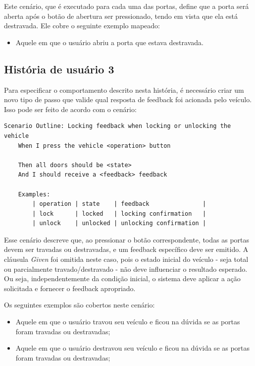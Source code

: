 Este cenário, que é executado para cada uma das portas, define que a porta será aberta após o botão de abertura ser pressionado, tendo em vista que ela 
está destravada. Ele cobre o seguinte exemplo mapeado:

\begin{itemize}
    \item Aquele em que o usuário abriu a porta que estava destravada.
\end{itemize}


\subsection{História de usuário 3}

Para especificar o comportamento descrito nesta história, é necessário criar um novo tipo de passo que valide qual resposta de feedback foi acionada pelo veículo. 
Isso pode ser feito de acordo com o cenário:

\begin{verbatim}
Scenario Outline: Locking feedback when locking or unlocking the vehicle
    When I press the vehicle <operation> button

    Then all doors should be <state>
    And I should receive a <feedback> feedback

    Examples:
        | operation | state    | feedback               |
        | lock      | locked   | locking confirmation   |
        | unlock    | unlocked | unlocking confirmation |
\end{verbatim}

Esse cenário descreve que, ao pressionar o botão correspondente, todas as portas devem ser travadas ou destravadas, e um feedback específico deve ser emitido. A cláusula \textit{Given} foi omitida neste caso, pois o estado inicial do veículo - seja total ou parcialmente travado/destravado - não deve influenciar 
o resultado esperado. Ou seja, independentemente da condição inicial, o sistema deve aplicar a ação solicitada e fornecer o feedback apropriado.

Os seguintes exemplos são cobertos neste cenário:

\begin{itemize}
    \item Aquele em que o usuário travou seu veículo e ficou na dúvida se as portas foram travadas ou destravadas;
    \item Aquele em que o usuário destravou seu veículo e ficou na dúvida se as portas foram travadas ou destravadas;
\end{itemize}

